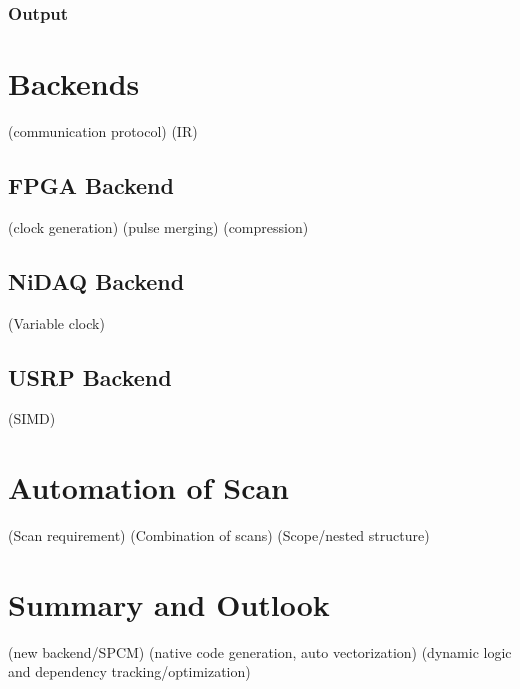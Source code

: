 \subsubsection{Output}

\section{Backends}
\label{ch:computer-control:backend}
(communication protocol)
(IR)

\subsection{FPGA Backend}
(clock generation)
(pulse merging)
(compression)

\subsection{NiDAQ Backend}
(Variable clock)

\subsection{USRP Backend}
(SIMD)

\section{Automation of Scan}
\label{ch:computer-control:scan}

(Scan requirement)
(Combination of scans)
(Scope/nested structure)

\section{Summary and Outlook}
\label{ch:computer-control:summary}
(new backend/SPCM)
(native code generation, auto vectorization)
(dynamic logic and dependency tracking/optimization)
